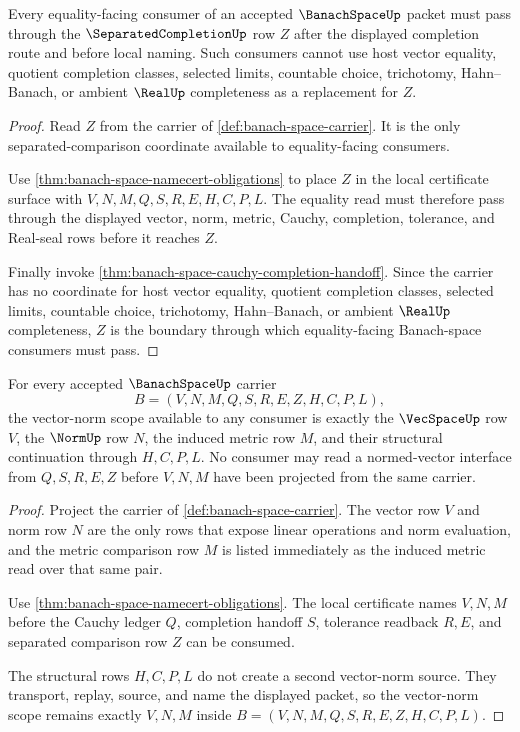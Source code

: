 \begin{theorem}
\label{thm:banach-space-separated-completion-boundary}
Every equality-facing consumer of an accepted $\BanachSpaceUp$ packet must pass through the $\SeparatedCompletionUp$ row $Z$ after the displayed completion route and before local naming. Such consumers cannot use host vector equality, quotient completion classes, selected limits, countable choice, trichotomy, Hahn--Banach, or ambient $\RealUp$ completeness as a replacement for $Z$.
\end{theorem}
\begin{proof}
Read $Z$ from the carrier of \autoref{def:banach-space-carrier}. It is the only separated-comparison coordinate available to equality-facing consumers.

Use \autoref{thm:banach-space-namecert-obligations} to place $Z$ in the local certificate surface with $V,N,M,Q,S,R,E,H,C,P,L$. The equality read must therefore pass through the displayed vector, norm, metric, Cauchy, completion, tolerance, and Real-seal rows before it reaches $Z$.

Finally invoke \autoref{thm:banach-space-cauchy-completion-handoff}. Since the carrier has no coordinate for host vector equality, quotient completion classes, selected limits, countable choice, trichotomy, Hahn--Banach, or ambient $\RealUp$ completeness, $Z$ is the boundary through which equality-facing Banach-space consumers must pass.
\end{proof}

\begin{theorem}
\label{thm:banach-space-vector-norm-scope}
For every accepted $\BanachSpaceUp$ carrier
$$
B=(V,N,M,Q,S,R,E,Z,H,C,P,L),
$$
the vector-norm scope available to any consumer is exactly the $\VecSpaceUp$ row $V$, the $\NormUp$ row $N$, the induced metric row $M$, and their structural continuation through $H,C,P,L$. No consumer may read a normed-vector interface from $Q,S,R,E,Z$ before $V,N,M$ have been projected from the same carrier.
\end{theorem}
\begin{proof}
Project the carrier of \autoref{def:banach-space-carrier}. The vector row $V$ and norm row $N$ are the only rows that expose linear operations and norm evaluation, and the metric comparison row $M$ is listed immediately as the induced metric read over that same pair.

Use \autoref{thm:banach-space-namecert-obligations}. The local certificate names $V,N,M$ before the Cauchy ledger $Q$, completion handoff $S$, tolerance readback $R,E$, and separated comparison row $Z$ can be consumed.

The structural rows $H,C,P,L$ do not create a second vector-norm source. They transport, replay, source, and name the displayed packet, so the vector-norm scope remains exactly $V,N,M$ inside $B=(V,N,M,Q,S,R,E,Z,H,C,P,L)$.
\end{proof}

